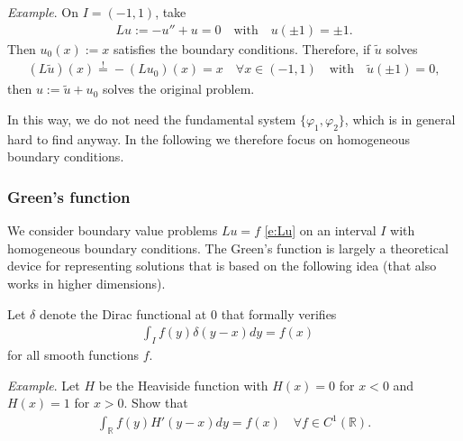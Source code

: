 \documentclass[12pt,a4paper]{article}
\newcommand{\IR}{\mathbb{R}}
\begin{document}
    
    \emph{Example}.
    On $I = (-1, 1)$,
    take
    \begin{align}
        L u := -u'' + u = 0
        \quad\text{with}\quad
        u(\pm 1) = \pm 1
        .
    \end{align}
    Then $u_0(x) := x$ satisfies the boundary conditions.
    Therefore, if $\tilde{u}$ solves
    \begin{align}
        (L \tilde{u})(x) \stackrel{!}{=} -(L u_0)(x) = x
        \quad
        \forall x \in (-1, 1)
        \quad\text{with}\quad
        \tilde{u}(\pm 1) = 0,
    \end{align}
    then $u := \tilde{u} + u_0$ solves the original problem.
    
    
    In this way,
    we do not need 
    the fundamental system $\{ \varphi_1, \varphi_2 \}$,
    which is in general hard to find anyway.
    In the following we therefore focus on 
    homogeneous boundary conditions.
    
    
    \subsubsection*{Green's function}
    
    We consider boundary value problems 
    $L u = f$ \eqref{e:Lu}
    on an interval $I$
    with homogeneous boundary conditions.
    The Green's function is largely a theoretical device
    for representing solutions 
    that is based on 
    the following idea
    (that also works in higher dimensions).
    
    
    Let $\delta$ denote the Dirac functional at $0$
    that formally verifies 
    \begin{align}
        \label{e:delta}
        \int_I f(y) \delta(y - x) dy
        =
        f(x)
        \quad
    \end{align}
    for all smooth functions $f$.
    
    
    \emph{Example}.
    Let $H$ be the Heaviside function
    with $H(x) = 0$ for $x < 0$
    and $H(x) = 1$ for $x > 0$.
    Show that
    \begin{align}
        \int_{\IR} f(y) H'(y - x) dy
        =
        f(x)
        \quad
        \forall f \in C^1(\IR)
        .
    \end{align}
    
\end{document}
